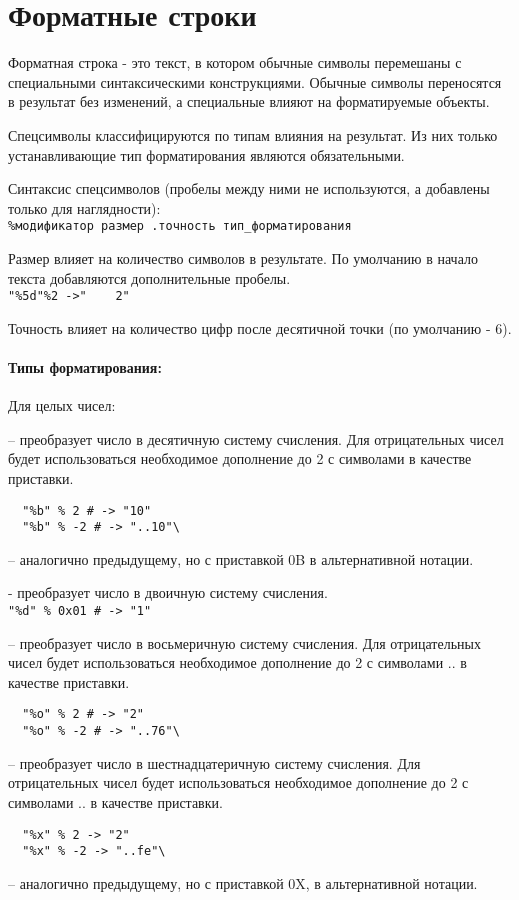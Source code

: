 \hypertarget{appformat}{}
\chapter{Форматные строки}

Форматная строка - это текст, в котором обычные символы перемешаны с специальными синтаксическими конструкциями. Обычные символы переносятся в результат без изменений, а специальные влияют на форматируемые объекты.

Спецсимволы классифицируются по типам влияния на результат. Из них только устанавливающие тип форматирования являются обязательными.

Синтаксис спецсимволов (пробелы между ними не используются, а добавлены только для наглядности):
\\\verb!%модификатор размер .точность тип_форматирования!

Размер влияет на количество символов в результате. По умолчанию в начало текста добавляются дополнительные пробелы.
\\\verb!"%5d"%2 ->"    2"!

Точность влияет на количество цифр после десятичной точки (по умолчанию - 6).

\subsubsection*{Типы форматирования:}

\begin{keylist}{Для целых чисел:}

   – преобразует число в десятичную систему счисления. Для отрицательных чисел будет использоваться необходимое дополнение до 2 с символами  в качестве приставки.
  \begin{verbatim}
  "%b" % 2 # -> "10"
  "%b" % -2 # -> "..10"\
  \end{verbatim}
  
   – аналогично предыдущему, но с приставкой 0B в альтернативной нотации.
  
   - преобразует число в двоичную систему счисления.
  \\\verb!"%d" % 0x01 # -> "1"!
  
   – преобразует число в восьмеричную систему счисления. Для отрицательных чисел будет использоваться необходимое дополнение до 2 с символами .. в качестве приставки.
  \begin{verbatim}
  "%o" % 2 # -> "2"
  "%o" % -2 # -> "..76"\
  \end{verbatim}
  
   – преобразует число в шестнадцатеричную систему счисления. Для отрицательных чисел будет использоваться необходимое дополнение до 2 с символами .. в качестве приставки.
  \begin{verbatim}
  "%x" % 2 -> "2"
  "%x" % -2 -> "..fe"\
  \end{verbatim}
  
   – аналогично предыдущему, но с приставкой 0X,  в альтернативной нотации.
\end{keylist}

